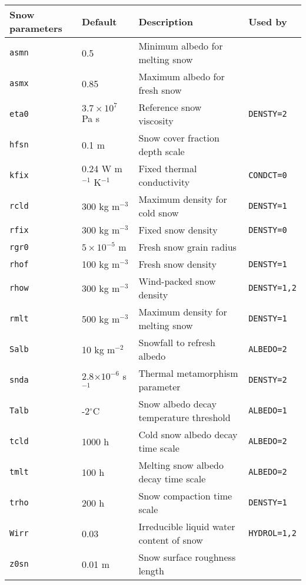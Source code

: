 \documentclass{article}
\begin{document}
\begin{longtable}{|l|l|l|l|} \hline
Snow parameters  & Default  & Description                             & Used by       \\ \hline
{\tt asmn} & 0.5            & Minimum albedo for melting snow         &               \\
{\tt asmx} & 0.85           & Maximum albedo for fresh snow           &               \\
{\tt eta0} & $3.7\times10^7$ Pa s & Reference snow viscosity          &{\tt DENSTY=2} \\
{\tt hfsn} & 0.1 m          & Snow cover fraction depth scale         &               \\
{\tt kfix} & 0.24 W m$^{-1}$ K$^{-1}$ & Fixed thermal conductivity    &{\tt CONDCT=0} \\
{\tt rcld} & 300 kg m$^{-3}$ & Maximum density for cold snow          &{\tt DENSTY=1} \\
{\tt rfix} & 300 kg m$^{-3}$ & Fixed snow density                     &{\tt DENSTY=0} \\
{\tt rgr0} & $5\times10^{-5}$ m & Fresh snow grain radius             &               \\
{\tt rhof} & 100 kg m$^{-3}$ & Fresh snow density                     &{\tt DENSTY=1} \\
{\tt rhow} & 300 kg m$^{-3}$ & Wind-packed snow density               &{\tt DENSTY=1,2} \\
{\tt rmlt} & 500 kg m$^{-3}$ & Maximum density for melting snow       &{\tt DENSTY=1} \\
{\tt Salb} & 10 kg m$^{-2}$ & Snowfall to refresh albedo              &{\tt ALBEDO=2} \\
{\tt snda} & 2.8$\times10^{-6}$ s$^{-1}$ & Thermal metamorphism parameter &{\tt DENSTY=2} \\
{\tt Talb} & -2$^\circ$C    & Snow albedo decay temperature threshold &{\tt ALBEDO=1} \\
{\tt tcld} & 1000 h         & Cold snow albedo decay time scale       &{\tt ALBEDO=2} \\
{\tt tmlt} & 100 h          & Melting snow albedo decay time scale    &{\tt ALBEDO=2} \\
{\tt trho} & 200 h          & Snow compaction time scale              &{\tt DENSTY=1} \\ 
{\tt Wirr} & 0.03           & Irreducible liquid water content of snow&{\tt HYDROL=1,2} \\
{\tt z0sn} & 0.01 m         & Snow surface roughness length           &               \\ \hline 
\end{longtable}
\end{document}
